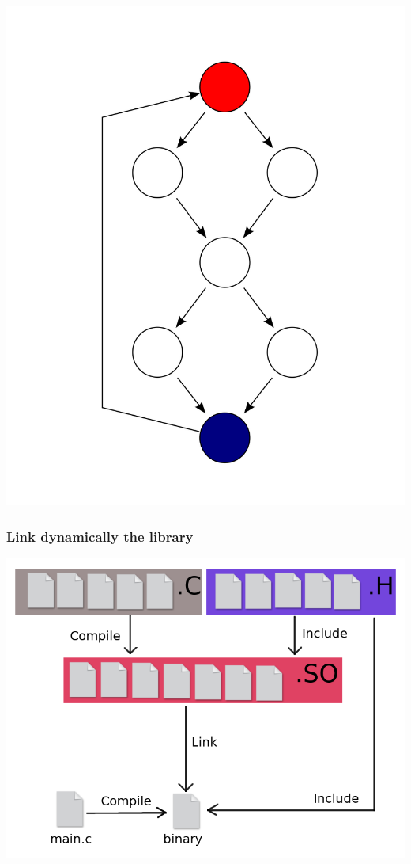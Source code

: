 \documentclass[11pt]{beamer}
\begin{document}
\begin{frame}
\begin{center}
    \includegraphics[scale=0.05]{cfg.png}
    \end{center}

\end{frame}

\begin{frame}
    \frametitle{Link dynamically the library}
    \includegraphics[scale=0.36]{compil1.png}
\end{frame}
\end{document}
